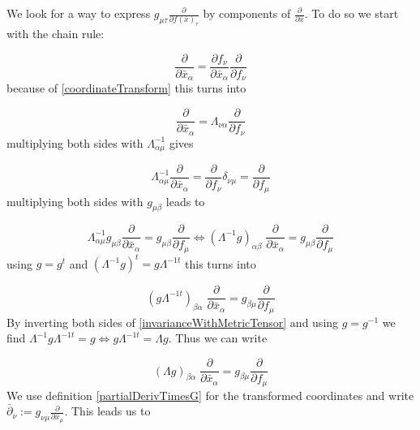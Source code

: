 \documentclass{article}
\begin{document}
We look for a way to express $g_{\mu\tau} \frac{\partial}{\partial f(\bar{x})_\tau}$ by components of $\frac{\partial}{\partial \bar{x}}$.
To do so we start with the chain rule:

\begin{equation}
    \frac{\partial}{\partial \bar{x}_\alpha} = \frac{\partial f_\nu}{\partial \bar{x}_\alpha} \frac{\partial}{\partial f_\nu}
\end{equation}
because of \ref{coordinateTransform} this turns into

\begin{equation}
    \frac{\partial}{\partial \bar{x}_\alpha} = \Lambda_{\nu\alpha} \frac{\partial}{\partial f_\nu}
\end{equation}
multiplying both sides with $\Lambda^{-1}_{\alpha\mu}$ gives

\begin{equation}
    \Lambda^{-1}_{\alpha\mu} \frac{\partial}{\partial \bar{x}_\alpha} = \frac{\partial}{\partial f_\nu} \delta_{\nu\mu} = \frac{\partial}{\partial f_\mu}
\end{equation}
multiplying both sides with $g_{\mu\beta}$ leads to

\begin{equation}
    \Lambda^{-1}_{\alpha\mu} g_{\mu\beta} \frac{\partial}{\partial \bar{x}_\alpha} = g_{\mu\beta} \frac{\partial}{\partial f_\mu}
    \iff (\Lambda^{-1}  g )_{\alpha\beta} \; \frac{\partial}{\partial \bar{x}_\alpha} = g_{\mu\beta} \frac{\partial}{\partial f_\mu}
\end{equation}
using $g = g^t$ and $(\Lambda^{-1} g)^t = g \Lambda^{-1 t}$ this turns into

\begin{equation}
    (g \Lambda^{-1 t} )_{\beta\alpha} \; \frac{\partial}{\partial \bar{x}_\alpha} = g_{\beta\mu} \frac{\partial}{\partial f_\mu}
\end{equation}
By inverting both sides of \ref{invarianceWithMetricTensor} and using $g=g^{-1}$ we find
$\Lambda^{-1}g\Lambda^{-1t} = g \iff g\Lambda^{-1t} = \Lambda g$.
Thus we can write

\begin{equation}
    (\Lambda g )_{\beta\alpha} \; \frac{\partial}{\partial \bar{x}_\alpha} = g_{\beta\mu} \frac{\partial}{\partial f_\mu}
\end{equation}
We use definition \ref{partialDerivTimesG} for the transformed coordinates and write $\bar{\partial}_\nu := g_{\nu\mu} \frac{\partial}{\partial \bar{x}_\mu}$.
This leads us to
\end{document}
